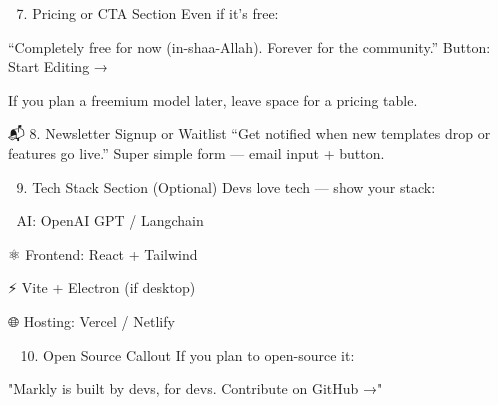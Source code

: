 🧾 7. Pricing or CTA Section
Even if it's free:

“Completely free for now (in-shaa-Allah). Forever for the community.”
Button: Start Editing →

If you plan a freemium model later, leave space for a pricing table.

📬 8. Newsletter Signup or Waitlist
“Get notified when new templates drop or features go live.”
Super simple form — email input + button.

🔧 9. Tech Stack Section (Optional)
Devs love tech — show your stack:

🧠 AI: OpenAI GPT / Langchain

⚛️ Frontend: React + Tailwind

⚡ Vite + Electron (if desktop)

🌐 Hosting: Vercel / Netlify

👨‍💻 10. Open Source Callout
If you plan to open-source it:

"Markly is built by devs, for devs. Contribute on GitHub →"